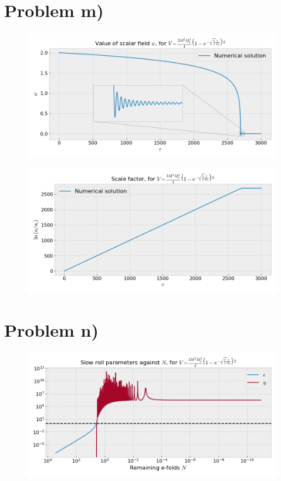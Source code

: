 \documentclass[reprint,english,notitlepage]{revtex4-1}  %
\numberwithin{equation}{section}
\begin{document}
\section{Problem m)}
\begin{figure}[h!]
	\includegraphics[width=\linewidth]{StarobinskyPotential_field-value.png}
	\caption{}
	\label{}
\end{figure}

\begin{figure}[h!]
	\includegraphics[width=\linewidth]{StarobinskyPotential_scale-factor.png}
	\caption{}
	\label{}
\end{figure}

\section{Problem n)}
\begin{figure}[h!]
	\includegraphics[width=\linewidth]{StarobinskyPotential_slowroll-N.png}
	\caption{}
	\label{}
\end{figure}
\end{document}
